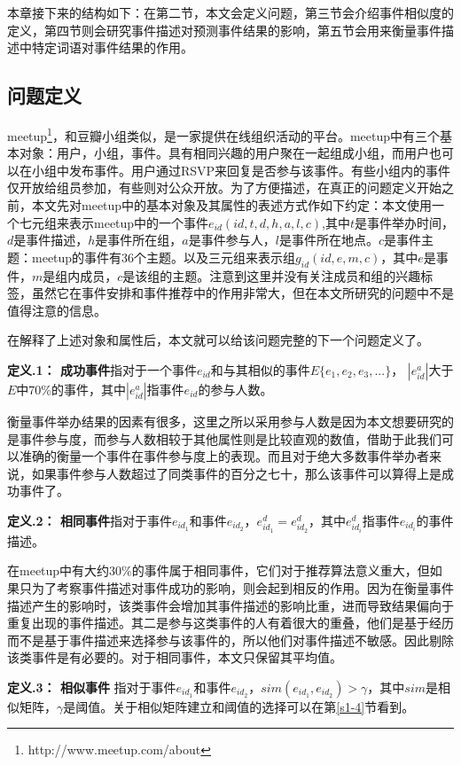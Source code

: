 本章接下来的结构如下：在第二节，本文会定义问题，第三节会介绍事件相似度的定义，第四节则会研究事件描述对预测事件结果的影响，第五节会用来衡量事件描述中特定词语对事件结果的作用。

\subsection{问题定义}
meetup\footnote{http://www.meetup.com/about}，和豆瓣小组类似，是一家提供在线组织活动的平台。meetup中有三个基本对象：用户，小组，事件。具有相同兴趣的用户聚在一起组成小组，而用户也可以在小组中发布事件。用户通过RSVP来回复是否参与该事件。有些小组内的事件仅开放给组员参加，有些则对公众开放。为了方便描述，在真正的问题定义开始之前，本文先对meetup中的基本对象及其属性的表述方式作如下约定：本文使用一个七元组来表示meetup中的一个事件\(e_{id}(id,t,d,h,a,l,c)\),其中\(t\)是事件举办时间，\(d\)是事件描述，\(h\)是事件所在组，\(a\)是事件参与人，\(l\)是事件所在地点。\(c\)是事件主题：meetup的事件有36个主题。以及三元组来表示组\(g_{id}(id,e,m,c)\)，其中\(e\)是事件，\(m\)是组内成员，\(c\)是该组的主题。注意到这里并没有关注成员和组的兴趣标签，虽然它在事件安排和事件推荐中的作用非常大，但在本文所研究的问题中不是值得注意的信息。

在解释了上述对象和属性后，本文就可以给该问题完整的下一个问题定义了。

\textbf{定义\thesection.1： 成功事件}指对于一个事件\(e_{id}\)和与其相似的事件\(E\{e_1,e_2,e_3,...\}\)，
\(|e_{id}^a|\)大于\(E\)中\(70\)\%的事件，其中$|e_{id}^a|$指事件$e_{id}$的参与人数。

衡量事件举办结果的因素有很多，这里之所以采用参与人数是因为本文想要研究的是事件参与度，而参与人数相较于其他属性则是比较直观的数值，借助于此我们可以准确的衡量一个事件在事件参与度上的表现。而且对于绝大多数事件举办者来说，如果事件参与人数超过了同类事件的百分之七十，那么该事件可以算得上是成功事件了。

\textbf{定义\thesection.2： 相同事件}指对于事件\(e_{id_1}\)和事件\(e_{id_2}\)，\(e_{id_1}^d=e_{id_2}^d\)，其中$e_{id_i}^d$指事件$e_{id_i}$的事件描述。

在meetup中有大约30\%的事件属于相同事件，它们对于推荐算法意义重大，但如果只为了考察事件描述对事件成功的影响，则会起到相反的作用。因为在衡量事件描述产生的影响时，该类事件会增加其事件描述的影响比重，进而导致结果偏向于重复出现的事件描述。其二是参与这类事件的人有着很大的重叠，他们是基于经历而不是基于事件描述来选择参与该事件的，所以他们对事件描述不敏感。因此剔除该类事件是有必要的。对于相同事件，本文只保留其平均值。

\textbf{定义\thesection.3： 相似事件}
指对于事件\(e_{id_1}\)和事件\(e_{id_2}\)，\(sim(e_{id_1},e_{id_2})>\gamma\)，其中\(sim\)是相似矩阵，\(\gamma\)是阈值。关于相似矩阵建立和阈值的选择可以在第\ref{s1-4}节看到。

